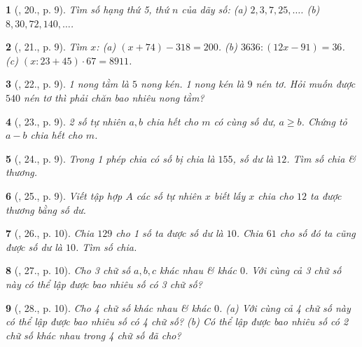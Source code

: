 \documentclass{article}
\newtheorem{baitoan}{}
\begin{document}
\begin{baitoan}[\cite{Tuyen_Toan_6}, 20., p. 9]
	Tìm số hạng thứ 5, thứ $n$ của dãy số: (a) $2,3,7,25,\ldots$. (b) $8,30,72,140,\ldots$.
\end{baitoan}

\begin{baitoan}[\cite{Tuyen_Toan_6}, 21., p. 9]
	Tìm $x$: (a) $(x + 74) - 318 = 200$. (b) $3636:(12x - 91) = 36$. (c) $(x:23 + 45)\cdot67 = 8911$.
\end{baitoan}

\begin{baitoan}[\cite{Tuyen_Toan_6}, 22., p. 9]
	1 nong tằm là $5$ nong kén. 1 nong kén là $9$ nén tơ. Hỏi muốn được $540$ nén tơ thì phải chăn bao nhiêu nong tằm?
\end{baitoan}

\begin{baitoan}[\cite{Tuyen_Toan_6}, 23., p. 9]
	2 số tự nhiên $a,b$ chia hết cho $m$ có cùng số dư, $a\ge b$. Chứng tỏ $a - b$ chia hết cho $m$.
\end{baitoan}

\begin{baitoan}[\cite{Tuyen_Toan_6}, 24., p. 9]
	Trong 1 phép chia có số bị chia là $155$, số dư là $12$. Tìm số chia \& thương.
\end{baitoan}

\begin{baitoan}[\cite{Tuyen_Toan_6}, 25., p. 9]
	Viết tập hợp $A$ các số tự nhiên $x$ biết lấy $x$ chia cho $12$ ta được thương bằng số dư.
\end{baitoan}

\begin{baitoan}[\cite{Tuyen_Toan_6}, 26., p. 10]
	Chia $129$ cho 1 số ta được số dư là $10$. Chia $61$ cho số đó ta cũng được số dư là $10$. Tìm số chia.
\end{baitoan}

\begin{baitoan}[\cite{Tuyen_Toan_6}, 27., p. 10]
	Cho 3 chữ số $a,b,c$ khác nhau \& khác $0$. Với cùng cả 3 chữ số này có thể lập được bao nhiêu số có 3 chữ số?
\end{baitoan}

\begin{baitoan}[\cite{Tuyen_Toan_6}, 28., p. 10]
	Cho 4 chữ số khác nhau \& khác $0$. (a) Với cùng cả 4 chữ số này có thể lập được bao nhiêu số có 4 chữ số? (b) Có thể lập được bao nhiêu số có 2 chữ số khác nhau trong 4 chữ số đã cho?
\end{baitoan}
\end{document}
